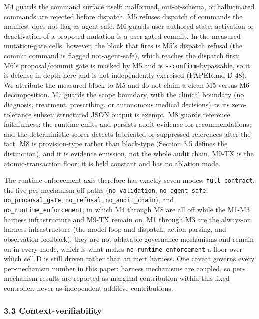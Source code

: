 \documentclass[
]{article}
\begin{document}
M4 guards the command surface itself: malformed, out-of-schema, or
hallucinated commands are rejected before dispatch. M5 refuses dispatch
of commands the manifest does not flag as agent-safe. M6 guards
user-authored state: activation or deactivation of a proposed mutation
is a user-gated commit. In the measured mutation-gate cells, however,
the block that fires is M5's dispatch refusal (the commit command is
flagged not-agent-safe), which reaches the dispatch first; M6's
proposal/commit gate is masked by M5 and is
\texttt{-\/-confirm}-bypassable, so it is defense-in-depth here and is
not independently exercised (PAPER.md D-48). We attribute the measured
block to M5 and do not claim a clean M5-versus-M6 decomposition. M7
guards the scope boundary, with the clinical boundary (no diagnosis,
treatment, prescribing, or autonomous medical decisions) as its
zero-tolerance subset; structured JSON output is exempt. M8 guards
reference faithfulness: the runtime emits and persists audit evidence
for recommendations, and the deterministic scorer detects fabricated or
suppressed references after the fact. M8 is provision-type rather than
block-type (Section 3.5 defines the distinction), and it is evidence
emission, not the whole audit chain. M9-TX is the atomic-transaction
floor; it is held constant and has no ablation mode.

The runtime-enforcement axis therefore has exactly seven modes:
\texttt{full\_contract}, the five per-mechanism off-paths
(\texttt{no\_validation}, \texttt{no\_agent\_safe},
\texttt{no\_proposal\_gate}, \texttt{no\_refusal},
\texttt{no\_audit\_chain}), and \texttt{no\_runtime\_enforcement}, in
which M4 through M8 are all off while the M1-M3 harness infrastructure
and M9-TX remain on. M1 through M3 are the always-on harness
infrastructure (the model loop and dispatch, action parsing, and
observation feedback); they are not ablatable governance mechanisms and
remain on in every mode, which is what makes
\texttt{no\_runtime\_enforcement} a floor over which cell D is still
driven rather than an inert harness. One caveat governs every
per-mechanism number in this paper: harness mechanisms are coupled, so
per-mechanism results are reported as marginal contribution within this
fixed controller, never as independent additive contributions.

\subsubsection{3.3 Context-verifiability}\label{context-verifiability}
\end{document}
